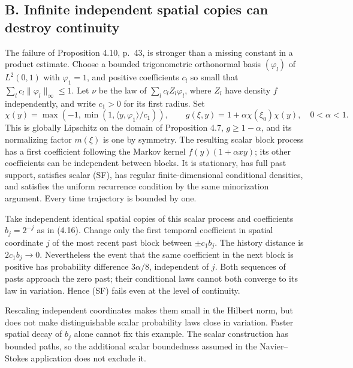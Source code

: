 \documentclass[10pt]{article}
\begin{document}
\subsection*{B. Infinite independent spatial copies can destroy continuity}
The failure of Proposition 4.10, p. 43, is stronger than a missing constant in a product estimate. Choose a bounded trigonometric orthonormal basis \((\varphi_l)\) of \(L^2(0,1)\) with \(\varphi_1=1\), and positive coefficients \(c_l\) so small that \(\sum_lc_l\|\varphi_l\|_\infty\leq1\). Let \(\nu\) be the law of \(\sum_l c_l Z_l\varphi_l\), where \(Z_l\) have density \(f\) independently, and write \(c_1>0\) for its first radius. Set \[\chi(y)=\max(-1,\min(1,\langle y,\varphi_1\rangle/c_1)),\qquad
 g(\xi,y)=1+\alpha\chi(\xi_0)\chi(y),\quad 0<\alpha<1.\] This is globally Lipschitz on the domain of Proposition 4.7, \(g\geq1-\alpha\), and its normalizing factor \(m(\xi)\) is one by symmetry. The resulting scalar block process has a first coefficient following the Markov kernel \(f(y)(1+\alpha xy)\); its other coefficients can be independent between blocks. It is stationary, has full past support, satisfies scalar (SF), has regular finite-dimensional conditional densities, and satisfies the uniform recurrence condition by the same minorization argument. Every time trajectory is bounded by one.\par
Take independent identical spatial copies of this scalar process and coefficients \(b_j=2^{-j}\) as in (4.16). Change only the first temporal coefficient in spatial coordinate \(j\) of the most recent past block between \(\pm c_1b_j\). The history distance is \(2c_1b_j\to0\). Nevertheless the event that the same coefficient in the next block is positive has probability difference \(3\alpha/8\), independent of \(j\). Both sequences of pasts approach the zero past; their conditional laws cannot both converge to its law in variation. Hence (SF) fails even at the level of continuity.\par
Rescaling independent coordinates makes them small in the Hilbert norm, but does not make distinguishable scalar probability laws close in variation. Faster spatial decay of \(b_j\) alone cannot fix this example. The scalar construction has bounded paths, so the additional scalar boundedness assumed in the Navier–Stokes application does not exclude it.\par
\end{document}
